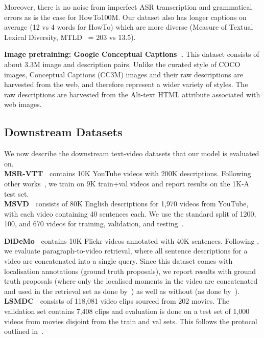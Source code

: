 \documentclass[10pt,twocolumn,letterpaper]{article}
\begin{document}
Moreover, there is no noise from imperfect ASR transcription and grammatical errors as is the case for HowTo100M. Our dataset also has longer captions on average (12 vs 4 words for HowTo) which are more diverse (Measure of Textual Lexical Diversity, MTLD~\cite{mccarthy2010mtld} = 203 vs 13.5).

\noindent\textbf{Image pretraining: Google Conceptual Captions~\cite{sharma2018conceptual}.}
This dataset consists of about 3.3M image and description pairs. Unlike the curated style of COCO images, Conceptual Captions (CC3M) images and their raw descriptions are harvested from the web, and therefore represent a wider variety of styles. The raw descriptions
are harvested from the Alt-text HTML attribute associated with web images.

\subsection{Downstream Datasets}
\label{subsec:datasets2}
We now describe the downstream text-video datasets that our model is evaluated on. \\
\noindent\textbf{MSR-VTT~\cite{xu2016msr}} contains
10K YouTube videos with 200K descriptions. Following other works~\cite{Liu19a}, we train on 9K train+val videos and report results on the 1K-A test set. \\
\noindent\textbf{MSVD~\cite{chen2011collecting}} consists of 80K English descriptions for 1,970 videos from YouTube, with each video containing 40 sentences each. We use the standard split of 1200, 100, and 670 videos for training, validation, and testing~\cite{patrick2020support,Liu19a}.

\noindent\textbf{DiDeMo~\cite{anne2017localizing}} contains 10K Flickr videos annotated with 40K sentences. Following \cite{lei2021less,Liu19a}, we evaluate paragraph-to-video retrieval, where all sentence descriptions for a video are concatenated into a single query. Since this dataset comes with localisation annotations (ground truth proposals), we report results with ground truth proposals (where only the localised moments in the video are concatenated and used in the retrieval set as done by~\cite{lei2021less}) as well as without (as done by~\cite{Liu19a}). \\

\noindent\textbf{LSMDC~\cite{Rohrbach_2015_CVPR}} consists of 118,081 video clips sourced from 202 movies. The validation set contains 7,408 clips and evaluation is done on a test set of 1,000 videos from movies disjoint from the train and val sets. This follows the protocol outlined in~\cite{rohrbach2017movie}.
\end{document}
